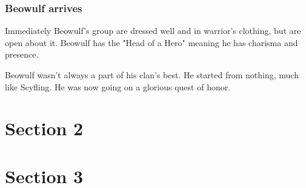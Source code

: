 \documentclass[11pt]{article}
\begin{document}
\subsubsection{Beowulf arrives}
\label{sec-1-1-5}
Immediately Beowulf's group are dressed well and in warrior's clothing,
but are open about it.  Beowulf has the "Head of a Hero" meaning he has
charisma and presence.

Beowulf wasn't always a part of his clan's best.  He started from
nothing, much like Scyfling.  He was now going on a glorious quest of 
honor.
\section{Section 2}
\label{sec-2}
\section{Section 3}
\label{sec-3}
\end{document}
